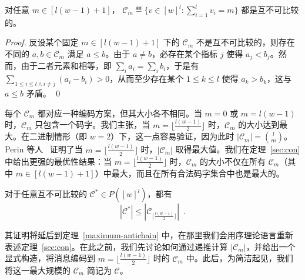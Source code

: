 \begin{theorem}
    \label{Eisantichain}
    对任意 $m\in[l(w-1)+1]$，
   $\mathcal{C}_m\eqdef\{v\in [w]^l : \sum_{i=1}^l v_i = m \}$ 都是互不可比较的。
\end{theorem}
\begin{proof}
反设某个固定 $m\in[l(w-1)+1]$ 下的 $\mathcal{C}_m$ 不是互不可比较的，则存在不同的 $a,b\in \mathcal{C}_m$ 满足 $a\leq b$。由于 $a\neq b$，必存在某个指标 $j$ 使得 $a_j<b_j$。然而，由于二者元素和相等，即 $\sum_i a_i=\sum_i b_i$，于是有 $\sum_{1\leq i\leq l \wedge i\neq j} (a_i-b_i)>0$，从而至少存在某个 $1\leq k\leq l$ 使得 $a_k>b_k$，这与 $a\leq b$ 矛盾。 \qed
\end{proof}

每个 $\mathcal{C}_m$ 都对应一种编码方案，但其大小各不相同。当 $m=0$ 或 $m=l(w-1)$ 时，$\mathcal{C}_m$ 只包含一个码字。我们主张，当 $m=\lfloor\frac{l(w-1)}{2}\rfloor$ 时，$\mathcal{C}_m$ 的大小达到最大。在二进制情形（即 $w=2$）下，这一点容易验证，因为此时 $|\mathcal{C}_m|=\binom{l}{m}$。Perin 等人~\cite{perin2021improved} 证明了当 $m=\lfloor\frac{l(w-1)}{2}\rfloor$ 时，$|\mathcal{C}_{m}|$ 取得最大值。我们在定理~\ref{sec:con} 中给出更强的最优性结果：当 $m=\lfloor\frac{l(w-1)}{2}\rfloor$ 时，$\mathcal{C}_{m}$ 的大小不仅在所有 $\mathcal{C}_m$（其中 $m\in[l(w-1)+1]$）中最大，而且在所有合法码字集合中也是最大的。

\begin{theorem}[尺寸最优编码]\label{sec:con}
对于任意互不可比较的 $\mathcal{C^*}\in P([w]^l)$，都有
\[
 |\mathcal{C^*}| \leq |\mathcal{C}_{\lfloor\frac{l(w-1)}{2}\rfloor}|\enspace.
\]
\end{theorem}
其证明将延后到定理~\ref{maximum-antichain} 中，在那里我们会用序理论语言重新表述定理~\ref{sec:con}。在此之前，我们先讨论如何通过递推计算 $|\mathcal{C}_m|$，并给出一个显式构造，将消息编码到 $m=\lfloor\frac{l(w-1)}{2}\rfloor$ 时的 $\mathcal{C}_{m}$ 中。此后，为简洁起见，我们将这一最大规模的 $\mathcal{C}_{m}$ 简记为 $\mathcal{C}$。


